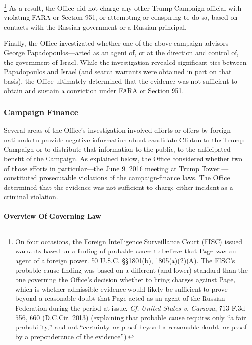\footnote{On four occasions, the Foreign Intelligence Surveillance Court (FISC) issued warrants based on a finding of probable cause to believe that Page was an agent of a foreign power.
50 U.S.C. \S\S 1801(b), 1805(a)(2)(A).
The FISC's probable-cause finding was based on a different (and lower) standard than the one governing the Office's decision whether to bring charges against Page, which is whether admissible evidence would likely be sufficient to prove beyond a reasonable doubt that Page acted as an agent of the Russian Federation during the period at issue.
\textit{Cf. United States v. Cardoza}, 713 F.3d 656, 660 (D.C.Cir. 2013) (explaining that probable cause requires only “a fair probability,” and not “certainty, or proof beyond a reasonable doubt, or proof by a preponderance of the evidence”).}
As a result, the Office did not charge  any other Trump Campaign official with violating FARA or Section 951, or attempting or conspiring to do so, based on contacts with the Russian government or a Russian principal.

Finally, the Office investigated whether one of the above campaign advisors---George Papadopoulos---acted as an agent of, or at the direction and control of, the government of Israel.
While the investigation revealed significant ties between Papadopoulos and Israel (and search warrants were obtained in part on that basis), the Office ultimately determined that the evidence was not sufficient to obtain and sustain a conviction under FARA or Section 951.

\subsubsection{Campaign Finance}
Several areas of the Office's investigation involved efforts or offers by foreign nationals to provide negative information about candidate Clinton to the Trump Campaign or to distribute that information to the public, to the anticipated benefit of the Campaign.
As explained below, the Office considered whether two of those efforts in particular---the June 9, 2016 meeting at Trump Tower ---constituted prosecutable violations of the campaign-finance laws.
The Office determined that the evidence was not sufficient to charge either incident as a criminal violation.

\paragraph{Overview Of Governing Law}

